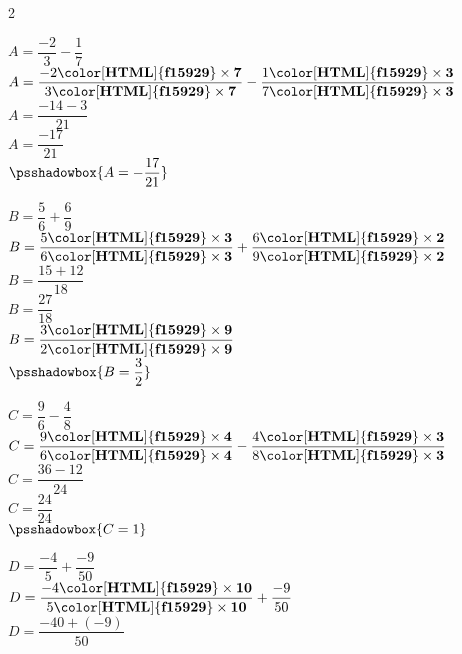 \begin{corrige}
    \phantom{rrr}    
    \begin{multicols}2
        \begin{list}{}{}
            \begin{spacing}{2}
            \item $A = \dfrac{-2}{3}-\dfrac{1}{7}$ \\
            $A = \dfrac{-2\mathbf{{\color[HTML]{f15929}\times 7}}}{3\mathbf{{\color[HTML]{f15929}\times 7}}}-\dfrac{1\mathbf{{\color[HTML]{f15929}\times 3}}}{7\mathbf{{\color[HTML]{f15929}\times 3}}}$ \\
            $A = \dfrac{-14-3}{21}$ \\
            $A = \dfrac{-17}{21}$ \\
            $\psshadowbox{A = -\dfrac{17}{21}}$ 
            \item $B = \dfrac{5}{6}+\dfrac{6}{9}$ \\
            $B = \dfrac{5\mathbf{{\color[HTML]{f15929}\times 3}}}{6\mathbf{{\color[HTML]{f15929}\times 3}}}+\dfrac{6\mathbf{{\color[HTML]{f15929}\times 2}}}{9\mathbf{{\color[HTML]{f15929}\times 2}}}$ \\
            $B = \dfrac{15+12}{18}$ \\
            $B = \dfrac{27}{18}$ \\
            $B = \dfrac{3\mathbf{{\color[HTML]{f15929}\times9}}}{2\mathbf{{\color[HTML]{f15929}\times9}}}$ \\
            $\psshadowbox{B = \dfrac{3}{2}}$ 
            \item $C = \dfrac{9}{6}-\dfrac{4}{8}$ \\
            $C = \dfrac{9\mathbf{{\color[HTML]{f15929}\times 4}}}{6\mathbf{{\color[HTML]{f15929}\times 4}}}-\dfrac{4\mathbf{{\color[HTML]{f15929}\times 3}}}{8\mathbf{{\color[HTML]{f15929}\times 3}}}$ \\
            $C = \dfrac{36-12}{24}$ \\
            $C = \dfrac{24}{24}$ \\
            $\psshadowbox{C = 1}$
            \columnbreak 
            \item $D = \dfrac{-4}{5}+\dfrac{-9}{50}$ \\
            $D = \dfrac{-4\mathbf{{\color[HTML]{f15929}\times 10}}}{5\mathbf{{\color[HTML]{f15929}\times 10}}}+\dfrac{-9}{50}$ \\
            $D = \dfrac{-40+(-9)}{50}$ \\

\end{spacing}
\end{list}
\end{multicols}
\end{corrige}
